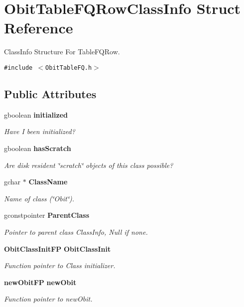 \section{Obit\-Table\-FQRow\-Class\-Info Struct Reference}
\label{structObitTableFQRowClassInfo}
Class\-Info Structure For Table\-FQRow.  


{\tt \#include $<$Obit\-Table\-FQ.h$>$}

\subsection*{Public Attributes}
\begin{CompactItemize}
\item 
gboolean {\bf initialized}
\begin{CompactList}\small\item\em Have I been initialized? \item\end{CompactList}\item 
gboolean {\bf has\-Scratch}
\begin{CompactList}\small\item\em Are disk resident \char`\"{}scratch\char`\"{} objects of this class possible? \item\end{CompactList}\item 
gchar $\ast$ {\bf Class\-Name}
\begin{CompactList}\small\item\em Name of class (\char`\"{}Obit\char`\"{}). \item\end{CompactList}\item 
gconstpointer {\bf Parent\-Class}
\begin{CompactList}\small\item\em Pointer to parent class Class\-Info, Null if none. \item\end{CompactList}\item 
{\bf Obit\-Class\-Init\-FP} {\bf Obit\-Class\-Init}
\begin{CompactList}\small\item\em Function pointer to Class initializer. \item\end{CompactList}\item 
{\bf new\-Obit\-FP} {\bf new\-Obit}
\begin{CompactList}\small\item\em Function pointer to new\-Obit. \item\end{CompactList}\item 

\end{CompactItemize}
